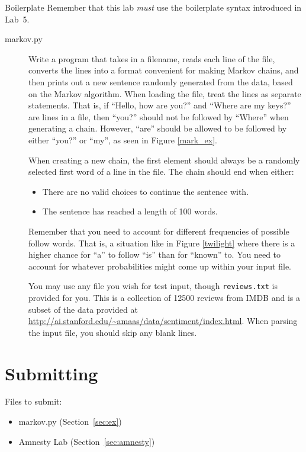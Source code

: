 \documentclass[11pt]{cselabheader}
\begin{document}
\begin{warningbox}{Boilerplate}
  Remember that this lab \emph{must} use the
  boilerplate syntax introduced in Lab~5.
\end{warningbox}

\begin{description}
\item[markov.py] Write a program that takes in a filename, reads each line of the file, converts the lines into a format convenient for making Markov chains, and then prints out a new sentence randomly generated from the data, based on the Markov algorithm. When loading the file, treat the lines as separate statements. That is, if ``Hello, how are you?'' and ``Where are my keys?'' are lines in a file, then ``you?'' should not be followed by ``Where'' when generating a chain. However, ``are'' should be allowed to be followed by either ``you?'' or ``my'', as seen in Figure \ref{mark_ex}.

  When creating a new chain, the first element should always be a randomly selected first word of a line in the file. The chain should end when either:
  \begin{itemize}
  \item There are no valid choices to continue the sentence with.
  \item The sentence has reached a length of 100 words.
  \end{itemize}

  Remember that you need to account for different frequencies of possible
  follow words. That is, a situation like in Figure \ref{twilight} where
  there is a higher chance for ``a'' to follow ``is'' than for ``known''
  to. You need to account for whatever probabilities might come up within
  your input file.

  You may use any file you wish for test input, though \lstinline{reviews.txt} is provided for you. This is a collection of 12500 reviews from IMDB and is a subset of the data provided at \url{http://ai.stanford.edu/~amaas/data/sentiment/index.html}. When parsing the input file, you should skip any blank lines.
  
\end{description}


\pagebreak
\section{Submitting}

Files to submit:
\begin{itemize}
\item markov.py (Section~\ref{sec:ex})
\item Amnesty Lab (Section~\ref{sec:amnesty})
\end{itemize}
\end{document}
